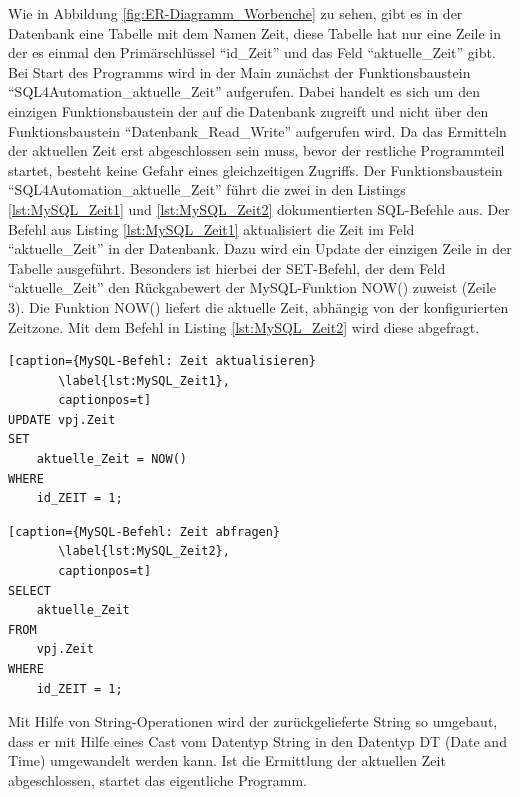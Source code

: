 Wie in Abbildung \ref{fig:ER-Diagramm_Worbenche} zu sehen, gibt es in der Datenbank eine Tabelle mit dem Namen Zeit, diese Tabelle hat nur eine Zeile in der es einmal den Primärschlüssel "`id\_Zeit"' und das Feld "`aktuelle\_Zeit"' gibt. Bei Start des Programms wird in der Main zunächst der Funktionsbaustein "`SQL4Automation\_aktuelle\_Zeit"' aufgerufen. Dabei handelt es sich um den einzigen Funktionsbaustein der auf die Datenbank zugreift und nicht über den Funktionsbaustein "`Datenbank\_Read\_Write"' aufgerufen wird. Da das Ermitteln der aktuellen Zeit erst abgeschlossen sein muss, bevor der restliche Programmteil startet, besteht keine Gefahr eines gleichzeitigen Zugriffs.
Der Funktionsbaustein "`SQL4Automation\_aktuelle\_Zeit"' führt die zwei in den Listings \ref{lst:MySQL_Zeit1} und \ref{lst:MySQL_Zeit2} dokumentierten SQL-Befehle aus.
Der Befehl aus Listing \ref{lst:MySQL_Zeit1} aktualisiert die Zeit im Feld "`aktuelle\_Zeit"' in der Datenbank. Dazu wird ein Update der einzigen Zeile in der Tabelle ausgeführt. Besonders ist hierbei der SET-Befehl, der dem Feld "`aktuelle\_Zeit"' den Rückgabewert der MySQL-Funktion NOW() zuweist (Zeile 3). Die Funktion NOW() liefert die aktuelle Zeit, abhängig von der konfigurierten Zeitzone. Mit dem Befehl in Listing \ref{lst:MySQL_Zeit2} wird diese abgefragt.

\begin{lstlisting}[caption={MySQL-Befehl: Zeit aktualisieren}
       \label{lst:MySQL_Zeit1},
       captionpos=t] 
UPDATE vpj.Zeit
SET
    aktuelle_Zeit = NOW()
WHERE
    id_ZEIT = 1;
\end{lstlisting}


\begin{lstlisting}[caption={MySQL-Befehl: Zeit abfragen}
       \label{lst:MySQL_Zeit2},
       captionpos=t] 
SELECT
    aktuelle_Zeit
FROM
    vpj.Zeit
WHERE
    id_ZEIT = 1;
\end{lstlisting}

Mit Hilfe von String-Operationen wird der zurückgelieferte String so umgebaut, dass er mit Hilfe eines Cast vom Datentyp String in den Datentyp DT (Date and Time) umgewandelt werden kann. Ist die Ermittlung der aktuellen Zeit abgeschlossen, startet das eigentliche Programm.